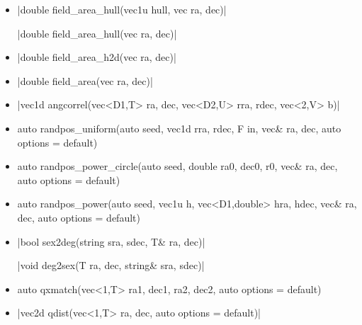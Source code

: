 \documentclass[12pt]{report}
\newcommand*\circled[1]{\tikz[baseline=(char.base)]{
            \node[shape=circle,draw,inner sep=0.0pt] (char) {#1};}}
\newcommand{\vectorfuncsym}{\circled{$\hspace{-1pt}\mathcal{V}$}\xspace}
\newcommand{\vectorfunc}{\vectorfuncsym\hspace{2pt}\xspace}
\begin{document}
\begin{itemize}
\item \cppinline|double field_area_hull(vec1u hull, vec ra, dec)| 

\cppinline|double field_area_hull(vec ra, dec)|

\item \cppinline|double field_area_h2d(vec ra, dec)| 

\item \cppinline|double field_area(vec ra, dec)| 

\item \cppinline|vec1d angcorrel(vec<D1,T> ra, dec, vec<D2,U> rra, rdec, vec<2,V> b)| 

\item {} \begin{cppcode}
auto randpos_uniform(auto seed, vec1d rra, rdec, F in,
                     vec& ra, dec, auto options = default)
\end{cppcode}

\item {} \begin{cppcode}
auto randpos_power_circle(auto seed, double ra0, dec0, r0,
                          vec& ra, dec, auto options = default)
\end{cppcode}

\item {} \begin{cppcode}
auto randpos_power(auto seed, vec1u h, vec<D1,double> hra, hdec,
                   vec& ra, dec, auto options = default)
\end{cppcode}

\item \vectorfunc \cppinline|bool sex2deg(string sra, sdec, T& ra, dec)| 

\vectorfunc \cppinline|void deg2sex(T ra, dec, string& sra, sdec)| 

\item {} \begin{cppcode}
auto qxmatch(vec<1,T> ra1, dec1, ra2, dec2,
             auto options = default)
\end{cppcode}

\item \cppinline|vec2d qdist(vec<1,T> ra, dec, auto options = default)| 
\end{itemize}
\end{document}

